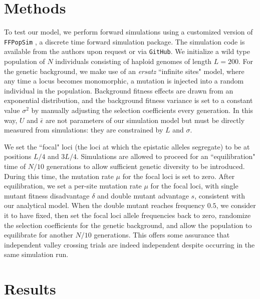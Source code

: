 \documentclass[rmp]{revtex4}
\begin{document}
\section*{Methods}

To test our model, we perform forward simulations using a customized version of \texttt{FFPopSim} \citep{zanini_2012}, a discrete time forward simulation package.
The simulation code is available from the authors upon request or via \texttt{GitHub}.
We initialize a wild type population of $N$ individuals consisting of haploid genomes of length $L = 200$.
For the genetic background, we make use of an \emph{ersatz} ``infinite sites" model, where any time a locus becomes monomorphic, a mutation is injected into a random individual in the population.
Background fitness effects are drawn from an exponential distribution, and the background fitness variance is set to a constant value $\sigma^2$ by manually adjusting the selection coefficients every generation.
In this way, $U$ and $\bar{\epsilon}$ are not parameters of our simulation model but must be directly measured from simulations: they are constrained by $L$ and $\sigma$.

We set the ``focal" loci (the loci at which the epistatic alleles segregate) to be at positions $L/4$ and $3L/4$.
Simulations are allowed to proceed for an ``equilibration" time of $N/10$ generations to allow sufficient genetic diversity to be introduced.
During this time, the mutation rate $\mu$ for the focal loci is set to zero.
After equilibration, we set a per-site mutation rate $\mu$ for the focal loci, with single mutant fitness disadvantage $\delta$ and double mutant advantage $s$, consistent with our analytical model.
When the double mutant reaches frequency $0.5$, we consider it to have fixed, then set the focal loci allele frequencies back to zero, randomize the selection coefficients for the genetic background, and allow the population to equilibrate for another $N/10$ generations.
This offers some assurance that independent valley crossing trials are indeed independent despite occurring in the same simulation run.
	
\section*{Results}
\end{document}

